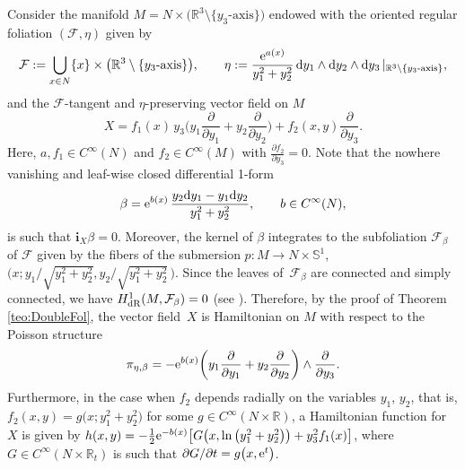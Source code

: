 \documentclass[pdftex]{sigma}%
\newcommand{\R}[1]{\mathbb{R}^{#1}}
\newcommand{\dd}{{\rm d}}
\newcommand{\ii}{\mathbf{i}}
\numberwithin{equation}{section}
\begin{document}
\begin{Example}
Consider the manifold $M = N \times \big(\R{3} \setminus \{y_{3}\text{-axis}\}\big)$ endowed with the oriented regular foliation $(\mathcal{F}, \eta)$ given by
\[
\mathcal{F} := \bigcup_{x \in N}\{x\} \times \big(\R{3} \setminus \{y_{3}\text{-axis}\}\big), \qquad
\eta := \frac{{\rm e}^{a(x)}}{y_{1}^{2} + y_{2}^{2}}\, \dd{y_{1}} \wedge \dd{y_{2}} \wedge \dd{y_{3}}\,|_{\R{3} \setminus \{y_{3}\text{-axis}\}},
\]
and the $\mathcal{F}$-tangent and $\eta$-preserving vector field on $M$
 \begin{equation*}
 X = f_{1}(x)\, y_{3} \bigg( y_{1} \frac{\partial}{\partial y_{1}} + y_{2} \frac{\partial}{\partial y_{2}} \bigg) + f_{2}(x, y) \frac{\partial}{\partial y_{3}}.
 \end{equation*}
Here, $a, f_{1} \in C^{\infty}(N)$ and $f_{2} \in C^{\infty}(M)$ with $\frac{\partial f_{2}}{\partial y_{3}} = 0$. Note that the nowhere vanishing and leaf-wise closed differential 1-form
 \begin{equation*}
 \beta = {\rm e}^{b(x)}\,\frac{y_{2} \dd y_{1} - y_{1} \dd y_{2}}{y_{1}^2 + y_{2}^2}, \qquad b \in C^{\infty}(N),
 \end{equation*}
is such that $\ii_{X}\beta = 0$. Moreover, the kernel of $\beta$ integrates to the subfoliation $\mathcal{F}_{\beta}$ of $\mathcal{F}$ given by the fibers of the submersion $p\colon M \to N \times \mathbb{S}^{1}$, $\big( x; {y_{1}}/{\sqrt{y_{1}^{2} + y_{2}^{2}}}, {y_{2}}/{\sqrt{y_{1}^{2} + y_{2}^{2}}} \,\big)$.
Since the leaves of~$\mathcal{F}_{\beta}$ are connected and simply connected, we have $H^{1}_{{\rm dR}}(M, \mathcal{F}_{\beta}) = 0$ (see \cite[Proposition~7.4]{DazHec-91}). Therefore, by the proof of Theorem \ref{teo:DoubleFol}, the vector field~$X$ is Hamiltonian on $M$ with respect to the Poisson structure
 \begin{equation*}
 \pi_{\eta,\beta} = -{\rm e}^{b(x)}\bigg( y_{1}\frac{\partial}{\partial y_{1}} + y_{2}\frac{\partial}{\partial y_{2}} \bigg) \wedge \frac{\partial}{\partial y_{3}}.
 \end{equation*}
Furthermore, in the case when $f_{2}$ depends radially on the variables $y_1$, $y_2$, that is, $f_{2}(x,y) = g\big(x; y_{1}^{2} + y_{2}^{2}\big)$ for some $g\in C^{\infty}(N\times\mathbb{R})$, a Hamiltonian function for $X$ is given by $h(x,y) = -\frac{1}{2}{\rm e}^{-b(x)}\big[G\big(x,\ln\big(y_1^2+y_2^2\big)\big) + y_{3}^{2}f_{1}(x)\big]$, where $G\in C^{\infty}(N\times\mathbb{R}_{t})$ is such that ${\partial G}/{\partial t} = g\big(x,{\rm e}^{t}\big)$.
\end{Example}
\end{document}
